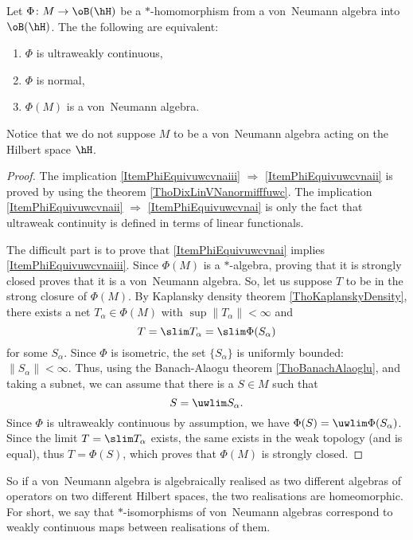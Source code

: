 \begin{theorem}				\label{ThoPhiEquivuwcvna}
Let $\Phi\colon M\to \oB(\hH)$ be a $*$-homomorphism from a von~Neumann algebra into $\oB(\hH)$. The the following are equivalent:
\begin{enumerate}
\item\label{ItemPhiEquivuwcvnai} $\Phi$ is ultraweakly continuous,
\item\label{ItemPhiEquivuwcvnaii}  $\Phi$ is normal,
\item\label{ItemPhiEquivuwcvnaiii}  $\Phi(M)$ is a von~Neumann algebra.
\end{enumerate}
\end{theorem}
Notice that we do not suppose $M$ to be a von~Neumann algebra acting on the Hilbert space $\hH$.

\begin{proof}
The implication \ref{ItemPhiEquivuwcvnaiii} $\Rightarrow$ \ref{ItemPhiEquivuwcvnaii} is proved by using the theorem \ref{ThoDixLinVNanormifffuwc}. The implication \ref{ItemPhiEquivuwcvnaii} $\Rightarrow$ \ref{ItemPhiEquivuwcvnai} is only the fact that ultraweak continuity is defined in terms of linear functionals.

The difficult part is to prove that \ref{ItemPhiEquivuwcvnai} implies \ref{ItemPhiEquivuwcvnaiii}. Since $\Phi(M)$ is a $*$-algebra, proving that it is strongly closed proves that it is a von~Neumann algebra. So, let us suppose $T$ to be in the strong closure of $\Phi(M)$. By Kaplansky density theorem \ref{ThoKaplanskyDensity}, there exists a net $T_{\alpha}\in\Phi(M)$ with $\sup\| T_{\alpha} \|<\infty$ and
\begin{equation}
	T=\slim T_{\alpha}=\slim \Phi(S_{\alpha})
\end{equation}
for some $S_{\alpha}$. Since $\Phi$ is isometric, the set $\{ S_{\alpha} \}$ is uniformly bounded: $\| S_{\alpha} \|<\infty$. Thus, using the Banach-Alaogu theorem \ref{ThoBanachAlaoglu}, and taking a subnet, we can assume that there is a $S\in M$ such that
\begin{equation}
	S=\uwlim S_{\alpha}.
\end{equation}
Since $\Phi$ is ultraweakly continuous by assumption, we have $\Phi(S)=\uwlim\Phi(S_{\alpha})$. Since the limit $T=\slim T_{\alpha}$ exists, the same exists in the weak topology (and is equal), thus $T=\Phi(S)$, which proves that $\Phi(M)$ is strongly closed.
\end{proof}

So if a von~Neumann algebra is algebraically realised as two different algebras of operators on two different Hilbert spaces, the two realisations are homeomorphic. For short, we say that $*$-isomorphisms of von~Neumann algebras correspond to weakly continuous maps between realisations of them.

